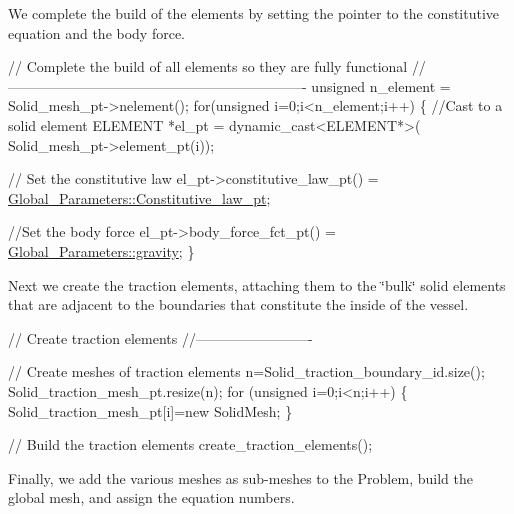 We complete the build of the elements by setting the pointer to the constitutive equation and the body force.


\begin{DoxyCodeInclude}
 
 
 
 \textcolor{comment}{// Complete the build of all elements so they are fully functional}
 \textcolor{comment}{//----------------------------------------------------------------}
 \textcolor{keywordtype}{unsigned} n\_element = Solid\_mesh\_pt->nelement();
 \textcolor{keywordflow}{for}(\textcolor{keywordtype}{unsigned} i=0;i<n\_element;i++)
  \{
   \textcolor{comment}{//Cast to a solid element}
   ELEMENT *el\_pt = \textcolor{keyword}{dynamic\_cast<}ELEMENT*\textcolor{keyword}{>}(
    Solid\_mesh\_pt->element\_pt(i));
   
   \textcolor{comment}{// Set the constitutive law   }
   el\_pt->constitutive\_law\_pt() =
    \hyperlink{namespaceGlobal__Parameters_adbd1f040f375c96fe56b3f475f7dbec2}{Global\_Parameters::Constitutive\_law\_pt};
   
   \textcolor{comment}{//Set the body force}
   el\_pt->body\_force\_fct\_pt() = \hyperlink{namespaceGlobal__Parameters_a200109847bf4cc26da4d00e8d68d569e}{Global\_Parameters::gravity};
  \}

\end{DoxyCodeInclude}


Next we create the traction elements, attaching them to the \char`\"{}bulk\char`\"{} solid elements that are adjacent to the boundaries that constitute the inside of the vessel.


\begin{DoxyCodeInclude}
 
 
 \textcolor{comment}{// Create traction elements}
 \textcolor{comment}{//-------------------------}
 
 \textcolor{comment}{// Create meshes of traction elements}
 n=Solid\_traction\_boundary\_id.size();
 Solid\_traction\_mesh\_pt.resize(n);
 \textcolor{keywordflow}{for} (\textcolor{keywordtype}{unsigned} i=0;i<n;i++)
  \{
   Solid\_traction\_mesh\_pt[i]=\textcolor{keyword}{new} SolidMesh;
  \}
 
 \textcolor{comment}{// Build the traction elements}
 create\_traction\_elements();

\end{DoxyCodeInclude}


Finally, we add the various meshes as sub-\/meshes to the {\ttfamily Problem}, build the global mesh, and assign the equation numbers.


